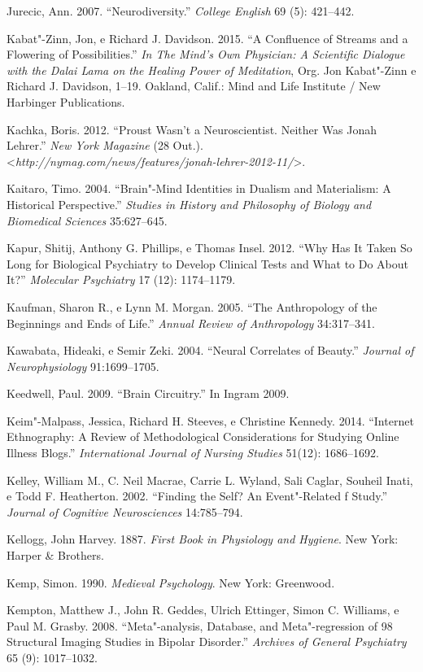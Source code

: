 Jurecic, Ann. 2007. ``Neurodiversity.'' \emph{College English} 69 (5):
421--442.

Kabat"-Zinn, Jon, e Richard J. Davidson. 2015. ``A Confluence of Streams
and a Flowering of Possibilities.'' \emph{In The Mind's Own Physician: A
Scientific Dialogue with the Dalai Lama on the Healing Power of
Meditation}, Org. Jon Kabat"-Zinn e Richard J. Davidson, 1--19. Oakland,
Calif.: Mind and Life Institute / New Harbinger Publications.

Kachka, Boris. 2012. ``Proust Wasn't a Neuroscientist. Neither Was Jonah
Lehrer.'' \emph{New York Magazine} (28 Out.).
\textless{}\emph{http://nymag.com/news/features/jonah-lehrer-2012-11/}\textgreater{}.

Kaitaro, Timo. 2004. ``Brain"-Mind Identities in Dualism and Materialism:
A Historical Perspective.'' \emph{Studies in History and Philosophy of
Biology and Biomedical Sciences} 35:627--645.

Kapur, Shitij, Anthony G. Phillips, e Thomas Insel. 2012. ``Why Has It
Taken So Long for Biological Psychiatry to Develop Clinical Tests and
What to Do About It?'' \emph{Molecular Psychiatry} 17 (12): 1174--1179.

Kaufman, Sharon R., e Lynn M. Morgan. 2005. ``The Anthropology of the
Beginnings and Ends of Life.'' \emph{Annual Review of Anthropology}
34:317--341.

Kawabata, Hideaki, e Semir Zeki. 2004. ``Neural Correlates of Beauty.''
\emph{Journal of Neurophysiology} 91:1699--1705.

Keedwell, Paul. 2009. ``Brain Circuitry.'' In Ingram 2009.

Keim"-Malpass, Jessica, Richard H. Steeves, e Christine Kennedy. 2014.
``Internet Ethnography: A Review of Methodological Considerations for
Studying Online Illness Blogs.'' \emph{International Journal of Nursing
Studies} 51(12): 1686--1692.

Kelley, William M., C. Neil Macrae, Carrie L. Wyland, Sali Caglar,
Souheil Inati, e Todd F. Heatherton. 2002. ``Finding the Self? An
Event"-Related f Study.'' \emph{Journal of Cognitive Neurosciences}
14:785--794.

Kellogg, John Harvey. 1887. \emph{First Book in Physiology and Hygiene}.
New York: Harper \& Brothers.

Kemp, Simon. 1990. \emph{Medieval Psychology}. New York: Greenwood.

Kempton, Matthew J., John R. Geddes, Ulrich Ettinger, Simon C. Williams,
e Paul M. Grasby. 2008. ``Meta"-analysis, Database, and Meta"-regression
of 98 Structural Imaging Studies in Bipolar Disorder.'' \emph{Archives
of General Psychiatry} 65 (9): 1017--1032.

